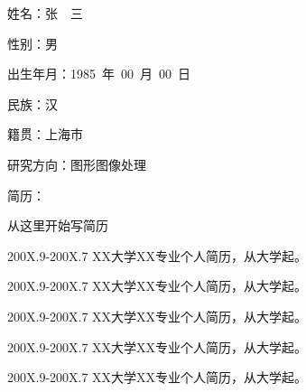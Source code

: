 
%
%
%


\begin{window}
\end{window}

姓名：张　三

性别：男

出生年月：1985~年~00~月~00~日

民族：汉

籍贯：上海市

研究方向：图形图像处理

简历：

从这里开始写简历

200X.9-200X.7  XX大学XX专业个人简历，从大学起。

200X.9-200X.7  XX大学XX专业个人简历，从大学起。

200X.9-200X.7  XX大学XX专业个人简历，从大学起。

200X.9-200X.7  XX大学XX专业个人简历，从大学起。

200X.9-200X.7  XX大学XX专业个人简历，从大学起。
